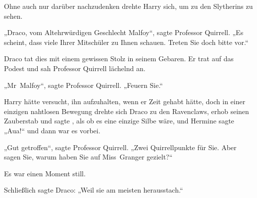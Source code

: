 Ohne auch nur darüber nachzudenken drehte Harry sich, um zu den Slytherins zu sehen.

„Draco, vom Altehrwürdigen Geschlecht Malfoy“, sagte Professor Quirrell. „Es scheint, dass viele Ihrer Mitschüler zu Ihnen schauen. Treten Sie doch bitte vor.“

Draco tat dies mit einem gewissen Stolz in seinem Gebaren. Er trat auf das Podest und sah Professor Quirrell lächelnd an.

„Mr~Malfoy“, sagte Professor Quirrell. „Feuern Sie.“

Harry hätte versucht, ihn aufzuhalten, wenn er Zeit gehabt hätte, doch in einer einzigen nahtlosen Bewegung drehte sich Draco zu den Ravenclaws, erhob seinen Zauberstab und sagte , als ob es eine einzige Silbe wäre, und Hermine sagte „Aua!“ und dann war es vorbei.

„Gut getroffen“, sagte Professor Quirrell. „Zwei Quirrellpunkte für Sie. Aber sagen Sie, warum haben Sie auf Miss~Granger gezielt?“

Es war einen Moment still.

Schließlich sagte Draco: „Weil sie am meisten herausstach.“

